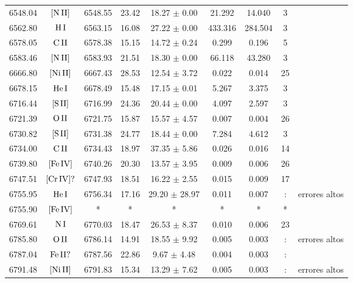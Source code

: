 \documentclass{article}
\begin{document}
\begin{table*}
\begin{adjustbox}{width=\textwidth}
\begin{tabular}{ccccccccc}
6548.04 & $\mbox{[N}\thinspace \mbox{II]}$ & 6548.55 & 23.42 & 18.27 $\pm$ 0.00 & 21.292 & 14.040 & 3 &  \\
6562.80 & $\mbox{H}\thinspace \mbox{I}$ & 6563.15 & 16.08 & 27.22 $\pm$ 0.00 & 433.316 & 284.504 & 3 &  \\
6578.05 & $\mbox{C}\thinspace \mbox{II}$ & 6578.38 & 15.15 & 14.72 $\pm$ 0.24 & 0.299 & 0.196 & 5 &  \\
6583.46 & $\mbox{[N}\thinspace \mbox{II]}$ & 6583.93 & 21.51 & 18.30 $\pm$ 0.00 & 66.118 & 43.280 & 3 &  \\
6666.80 & $\mbox{[Ni}\thinspace \mbox{II]}$ & 6667.43 & 28.53 & 12.54 $\pm$ 3.72 & 0.022 & 0.014 & 25 &  \\
6678.15 & $\mbox{He}\thinspace \mbox{I}$ & 6678.49 & 15.48 & 17.15 $\pm$ 0.01 & 5.267 & 3.375 & 3 &  \\
6716.44 & $\mbox{[S}\thinspace \mbox{II]}$ & 6716.99 & 24.36 & 20.44 $\pm$ 0.00 & 4.097 & 2.597 & 3 &  \\
6721.39 & $\mbox{O}\thinspace \mbox{II}$ & 6721.75 & 15.87 & 15.57 $\pm$ 4.57 & 0.007 & 0.004 & 26 &  \\
6730.82 & $\mbox{[S}\thinspace \mbox{II]}$ & 6731.38 & 24.77 & 18.44 $\pm$ 0.00 & 7.284 & 4.612 & 3 &  \\
6734.00 & $\mbox{C}\thinspace \mbox{II}$ & 6734.43 & 18.97 & 37.35 $\pm$ 5.86 & 0.026 & 0.016 & 14 &  \\
6739.80 & $\mbox{[Fe}\thinspace \mbox{IV]}$ & 6740.26 & 20.30 & 13.57 $\pm$ 3.95 & 0.009 & 0.006 & 26 &  \\
6747.51 & $\mbox{[Cr}\thinspace \mbox{IV]?}$ & 6747.93 & 18.51 & 16.22 $\pm$ 2.55 & 0.015 & 0.009 & 17 &  \\
6755.95 & $\mbox{He}\thinspace \mbox{I}$ & 6756.34 & 17.16 & 29.20 $\pm$ 28.97 & 0.011 & 0.007 & : &  errores altos \\
6755.90 & $\mbox{[Fe}\thinspace \mbox{IV]}$ & * & * & * & * & * & * &  \\
6769.61 & $\mbox{N}\thinspace \mbox{I}$ & 6770.03 & 18.47 & 26.53 $\pm$ 8.37 & 0.010 & 0.006 & 23 &  \\
6785.80 & $\mbox{O}\thinspace \mbox{II}$ & 6786.14 & 14.91 & 18.55 $\pm$ 9.92 & 0.005 & 0.003 & : &  errores altos \\
6787.04 & $\mbox{Fe}\thinspace \mbox{II?}$ & 6787.56 & 22.86 & 9.67 $\pm$ 4.48 & 0.004 & 0.003 & : &  \\
6791.48 & $\mbox{[Ni}\thinspace \mbox{II]}$ & 6791.83 & 15.34 & 13.29 $\pm$ 7.62 & 0.005 & 0.003 & : &  errores altos \\

\end{tabular}
\end{adjustbox}
\end{table*}
\end{document}
